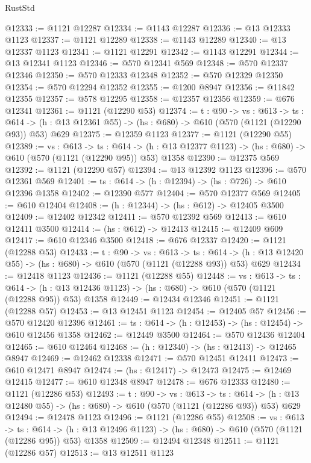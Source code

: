 \begin{lexlean}{RustStd}
\begin{coremodule}
@12333 := @1121 @12287
@12334 := @1143 @12287
@12336 := @13 @12333 @1123
@12337 := @1121 @12289
@12338 := @1143 @12289
@12340 := @13 @12337 @1123
@12341 := @1121 @12291
@12342 := @1143 @12291
@12344 := @13 @12341 @1123
@12346 := @570 @12341 @569
@12348 := @570 @12337 @12346
@12350 := @570 @12333 @12348
@12352 := @570 @12329 @12350
@12354 := @570 @12294 @12352
@12355 := @1200 @8947
@12356 := @11842 @12355
@12357 := @578 @12295
@12358 := @12357 @12356
@12359 := @676 @12341
@12361 := @1121 (@12290 @53)
@12374 := {t : @90} ->
  {vs : @613} ->
  {ts : @614} -> (h : @13 @12361 @55) -> (hs : @680) -> @610 (@570 (@1121 (@12290 @93)) @53) @629
@12375 := @12359 @1123
@12377 := @1121 (@12290 @55)
@12389 := {vs : @613} ->
  {ts : @614} -> (h : @13 @12377 @1123) -> (hs : @680) -> @610 (@570 (@1121 (@12290 @95)) @53) @1358
@12390 := @12375 @569
@12392 := @1121 (@12290 @57)
@12394 := @13 @12392 @1123
@12396 := @570 @12361 @569
@12401 := {ts : @614} -> (h : @12394) -> (hs : @726) -> @610 @12396 @1358
@12402 := @12390 @577
@12404 := @570 @12377 @569
@12405 := @610 @12404
@12408 := (h : @12344) -> (hs : @612) -> @12405 @3500
@12409 := @12402 @12342
@12411 := @570 @12392 @569
@12413 := @610 @12411 @3500
@12414 := (hs : @612) -> @12413
@12415 := @12409 @609
@12417 := @610 @12346 @3500
@12418 := @676 @12337
@12420 := @1121 (@12288 @53)
@12433 := {t : @90} ->
  {vs : @613} ->
  {ts : @614} -> (h : @13 @12420 @55) -> (hs : @680) -> @610 (@570 (@1121 (@12288 @93)) @53) @629
@12434 := @12418 @1123
@12436 := @1121 (@12288 @55)
@12448 := {vs : @613} ->
  {ts : @614} -> (h : @13 @12436 @1123) -> (hs : @680) -> @610 (@570 (@1121 (@12288 @95)) @53) @1358
@12449 := @12434 @12346
@12451 := @1121 (@12288 @57)
@12453 := @13 @12451 @1123
@12454 := @12405 @57
@12456 := @570 @12420 @12396
@12461 := {ts : @614} -> (h : @12453) -> (hs : @12454) -> @610 @12456 @1358
@12462 := @12449 @3500
@12464 := @570 @12436 @12404
@12465 := @610 @12464
@12468 := (h : @12340) -> (hs : @12413) -> @12465 @8947
@12469 := @12462 @12338
@12471 := @570 @12451 @12411
@12473 := @610 @12471 @8947
@12474 := (hs : @12417) -> @12473
@12475 := @12469 @12415
@12477 := @610 @12348 @8947
@12478 := @676 @12333
@12480 := @1121 (@12286 @53)
@12493 := {t : @90} ->
  {vs : @613} ->
  {ts : @614} -> (h : @13 @12480 @55) -> (hs : @680) -> @610 (@570 (@1121 (@12286 @93)) @53) @629
@12494 := @12478 @1123
@12496 := @1121 (@12286 @55)
@12508 := {vs : @613} ->
  {ts : @614} -> (h : @13 @12496 @1123) -> (hs : @680) -> @610 (@570 (@1121 (@12286 @95)) @53) @1358
@12509 := @12494 @12348
@12511 := @1121 (@12286 @57)
@12513 := @13 @12511 @1123

\end{coremodule}
\end{lexlean}
